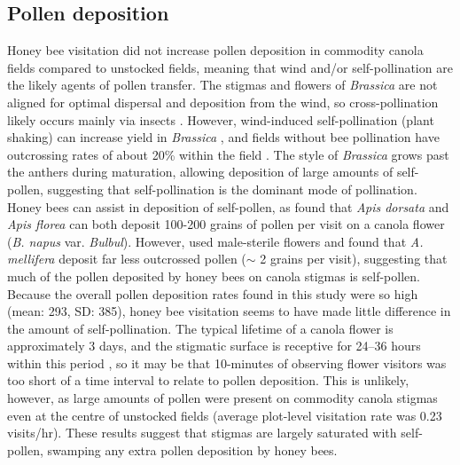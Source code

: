 \documentclass[12pt, draft]{article} %
\begin{document}
\subsection{Pollen deposition}
Honey bee visitation did not increase pollen deposition in commodity canola fields compared to unstocked fields, meaning that wind and/or self-pollination are the likely agents of pollen transfer.
The stigmas and flowers of \emph{Brassica} are not aligned for optimal dispersal and deposition from the wind, so cross-pollination likely occurs mainly via insects \citep{mesquida1982,cresswell2004}.
However, wind-induced self-pollination (plant shaking) can increase yield in \textit{Brassica} \citep{williams1986, mesquida1988c}, and fields without bee pollination have outcrossing rates of about 20\% within the field \citep{rakow1987,becker1992}.
The style of \textit{Brassica} grows past the anthers during maturation, allowing deposition of large amounts of self-pollen, suggesting that self-pollination is the dominant mode of pollination.
Honey bees can assist in deposition of self-pollen, as \citet{ali2011} found that \textit{Apis dorsata} and \textit{Apis florea} can both deposit 100-200 grains of pollen per visit on a canola flower (\emph{B. napus} var. \emph{Bulbul}).
However, \citet{waytesMsc} used male-sterile flowers and found that \textit{A. mellifera} deposit far less outcrossed pollen ($\sim$ 2 grains per visit), suggesting that much of the pollen deposited by honey bees on canola stigmas is self-pollen. 
Because the overall pollen deposition rates found in this study were so high (mean: 293, SD: 385), honey bee visitation seems to have made little difference in the amount of self-pollination.
The typical lifetime of a canola flower is approximately 3 days, and the stigmatic surface is receptive for 24--36 hours within this period \citep{eisikowitch1981,hoyle2007}, so it may be that 10-minutes of observing flower visitors was too short of a time interval to relate to pollen deposition.
This is unlikely, however, as large amounts of pollen were present on commodity canola stigmas even at the centre of unstocked fields (average plot-level visitation rate was 0.23 visits/hr).
These results suggest that stigmas are largely saturated with self-pollen, swamping any extra pollen deposition by honey bees.
\end{document}
